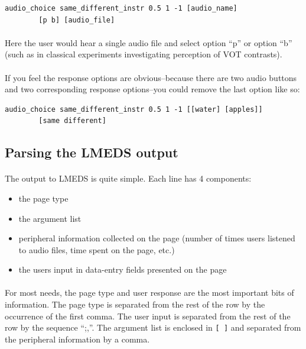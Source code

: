 \documentclass[12pt, oneside]{scrbook}   	%
\begin{document}
\begin{lstlisting}
audio_choice same_different_instr 0.5 1 -1 [audio_name]
		[p b] [audio_file]
\end{lstlisting}

\paragraph{}
Here the user would hear a single audio file and select option ``p'' or option ``b'' (such as in classical experiments investigating perception of VOT contrasts).

\paragraph{}
If you feel the response options are obvious--because there are two audio buttons and two corresponding response options--you could remove the last option like so:
\begin{lstlisting}
audio_choice same_different_instr 0.5 1 -1 [[water] [apples]]
		[same different]
\end{lstlisting}


\subsection{Parsing the LMEDS output}

\paragraph{}
The output to LMEDS is quite simple.  Each line has 4 components:
\begin{itemize}
\item	the page type
\item	the argument list
\item	peripheral information collected on the page (number of times users listened to audio files, time spent on the page, etc.)
\item	the users input in data-entry fields presented on the page
\end{itemize}

\paragraph{}
For most needs, the page type and user response are the most important bits of information.  The page type is separated from the rest of the row by the occurrence of the first comma.  The user input is separated from the rest of the row by the sequence ``;,''.  The argument list is enclosed in \texttt{[ ]} and separated from the peripheral information by a comma.  
\end{document}
